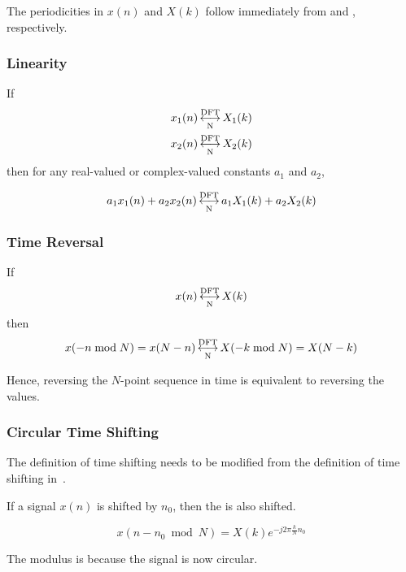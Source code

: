 The periodicities in $x(n)$ and $X(k)$ follow immediately from  and , respectively.

\subsubsection{Linearity}\label{subsubsec:DFT_Properties-Linearity}
If
\begin{align*}
  x_{1}(n) &\operatorname{\overset{\text{DFT}}{\underset{N}{\longleftrightarrow}}} X_{1}(k) \\
  x_{2}(n) &\operatorname{\overset{\text{DFT}}{\underset{N}{\longleftrightarrow}}} X_{2}(k)
\end{align*}
then for any real-valued or complex-valued constants $a_{1}$ and $a_{2}$,

\begin{equation}\label{eq:DFT_Properties-Linearity}
  a_{1}x_{1}(n) + a_{2}x_{2}(n) \operatorname{\overset{\text{DFT}}{\underset{N}{\longleftrightarrow}}} a_{1}X_{1}(k) + a_{2}X_{2}(k)
\end{equation}

\subsubsection{Time Reversal}\label{subsubsec:DFT_Properties-Time_Reversal}
If
\begin{equation*}
  x(n) \operatorname{\overset{\text{DFT}}{\underset{N}{\longleftrightarrow}}} X(k)
\end{equation*}
then
\begin{equation}\label{eq:DFT_Properties-Time_Reversal}
  x(-n \bmod N) = x(N-n) \operatorname{\overset{\text{DFT}}{\underset{N}{\longleftrightarrow}}} X(-k \bmod N) = X(N-k)
\end{equation}

Hence, reversing the $N$-point sequence in time is equivalent to reversing the  values.

\subsubsection{Circular Time Shifting}\label{subsubsec:DFT_Properties-Circular_Time_Shifting}
The definition of time shifting needs to be modified from the definition of time shifting in~.

\begin{definition}\label{def:DFT_Properties-Circular_Time_Shifting}
  If a signal $x(n)$ is shifted by $n_{0}$, then the  is also shifted.

  \begin{equation}\label{eq:DFT_Properties-Circular_Time_Shifting}
    x(n - n_{0} \bmod N) = X(k) e^{-j 2\pi \frac{k}{N} n_{0}}
  \end{equation}

  The modulus is because the signal is now circular.
\end{definition}

